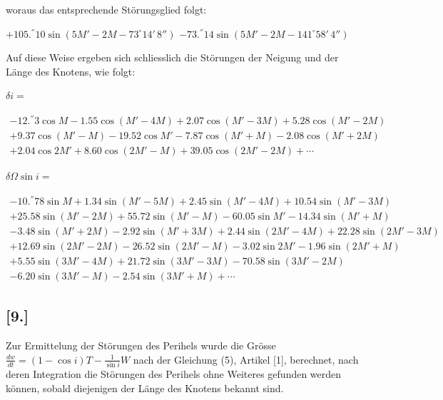 \documentclass[12pt,a4paper]{article}
\begin{document}
woraus das entsprechende Störungsglied folgt:
\begin{center}
$+105.^{''}10 \sin(5M' - 2M - 73^{\circ} 14'\, 8'')$ \quad $-73.^{''}14 \sin(5M' - 2M - 141^{\circ} 58'\, 4'')$
\end{center}

Auf diese Weise ergeben sich schliesslich die Störungen der Neigung und der Länge des Knotens, wie folgt:

\medskip
$\delta i =$ 
\begin{minipage}[t]{0.8\textwidth}
\begin{multline*}
-12.^{''}3 \cos M - 1.55 \cos(M' - 4M) + 2.07 \cos(M' - 3M) + 5.28 \cos(M' - 2M)\\
+ 9.37 \cos(M' - M) - 19.52 \cos M' - 7.87 \cos(M' + M) - 2.08 \cos(M' + 2M)\\
+ 2.04 \cos 2M' + 8.60 \cos(2M' - M) + 39.05 \cos(2M' - 2M) + \cdots
\end{multline*}
\end{minipage}

\medskip
$\delta \Omega \sin i =$
\begin{minipage}[t]{0.8\textwidth}
\begin{multline*}
-10.^{''}78 \sin M + 1.34 \sin(M' - 5M) + 2.45 \sin(M' - 4M) + 10.54 \sin(M' - 3M)\\
+ 25.58 \sin(M' - 2M) + 55.72 \sin(M' - M) - 60.05 \sin M' - 14.34 \sin(M' + M)\\
- 3.48 \sin(M' + 2M) - 2.92 \sin(M' + 3M) + 2.44 \sin(2M' - 4M) + 22.28 \sin(2M' - 3M)\\
+ 12.69 \sin(2M' - 2M) - 26.52 \sin(2M' - M) - 3.02 \sin 2M' - 1.96 \sin(2M' + M)\\
+ 5.55 \sin(3M' - 4M) + 21.72 \sin(3M' - 3M) - 70.58 \sin(3M' - 2M)\\
- 6.20 \sin(3M' - M) - 2.54 \sin(3M' + M) + \cdots
\end{multline*}
\end{minipage}

\medskip
\begin{center}
\end{center}

\subsection*{[9.]}

Zur Ermittelung der Störungen des Perihels wurde die Grösse $\frac{dw}{dt} = (1 - \cos i) T - \frac{1}{\sin i} W$ nach der Gleichung (5), Artikel [1], berechnet, nach deren Integration die Störungen des Perihels ohne Weiteres gefunden werden können, sobald diejenigen der Länge des Knotens bekannt sind.
\end{document}
